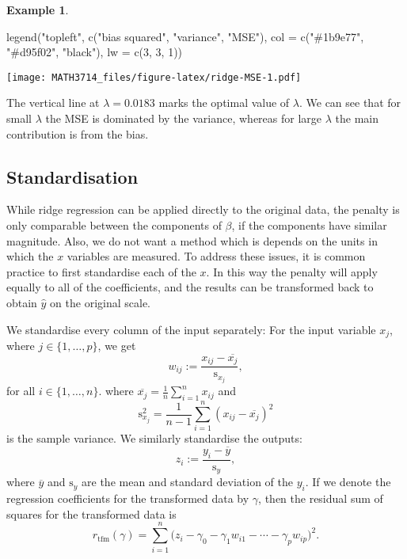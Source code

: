 \documentclass[
  a4paper,
]{article}
\newenvironment{Shaded}{\begin{snugshade}}{\end{snugshade}}
\newcommand{\AttributeTok}[1]{\textcolor[rgb]{0.77,0.63,0.00}{#1}}
\newcommand{\DecValTok}[1]{\textcolor[rgb]{0.00,0.00,0.81}{#1}}
\newcommand{\FunctionTok}[1]{\textcolor[rgb]{0.00,0.00,0.00}{#1}}
\newcommand{\NormalTok}[1]{#1}
\newcommand{\StringTok}[1]{\textcolor[rgb]{0.31,0.60,0.02}{#1}}
\theoremstyle{definition}
\theoremstyle{definition}
\newtheorem{example}{Example}[section]
\theoremstyle{definition}
\theoremstyle{definition}
\theoremstyle{remark}
\begin{document}
\begin{example}
\begin{Shaded}
\begin{Highlighting}[]
\FunctionTok{legend}\NormalTok{(}\StringTok{"topleft"}\NormalTok{,}
       \FunctionTok{c}\NormalTok{(}\StringTok{"bias squared"}\NormalTok{, }\StringTok{"variance"}\NormalTok{, }\StringTok{"MSE"}\NormalTok{),}
       \AttributeTok{col =} \FunctionTok{c}\NormalTok{(}\StringTok{"\#1b9e77"}\NormalTok{, }\StringTok{"\#d95f02"}\NormalTok{, }\StringTok{"black"}\NormalTok{),}
       \AttributeTok{lw =} \FunctionTok{c}\NormalTok{(}\DecValTok{3}\NormalTok{, }\DecValTok{3}\NormalTok{, }\DecValTok{1}\NormalTok{))}
\end{Highlighting}
\end{Shaded}

\texttt{[image: MATH3714\_files/figure-latex/ridge-MSE-1.pdf]}

The vertical line at \(\lambda = 0.0183\)
marks the optimal value of \(\lambda\). We can see that for small \(\lambda\) the
MSE is dominated by the variance, whereas for large \(\lambda\) the main
contribution is from the bias.
\end{example}

\hypertarget{standardisation}{%
\subsection{Standardisation}\label{standardisation}}

While ridge regression can be applied directly to the original data, the
penalty is only comparable between the components of \(\beta\), if the components
have similar magnitude. Also, we do not want a method which is depends on the
units in which the \(x\) variables are measured. To address these issues, it is
common practice to first standardise each of the \(x\). In this way the
penalty will apply equally to all of the coefficients, and the results can be
transformed back to obtain \(\hat{y}\) on the original scale.

We standardise every column of the input separately: For
the input variable \(x_j\), where \(j\in\{1, \ldots, p\}\), we get
\begin{equation*}
  w_{ij}
  := \frac{x_{ij} - \overline{x_j}}{\mathrm{s}_{x_j}},
\end{equation*}
for all \(i \in \{1, \ldots, n\}\).
where \(\overline{x_j} = \frac1n \sum_{i=1}^n x_{ij}\) and
\begin{equation*}
  \mathrm{s}_{x_j}^2
  = \frac{1}{n-1} \sum_{i=1}^n (x_{ij} - \overline{x_j})^2
\end{equation*}
is the sample variance. We similarly standardise the outputs:
\begin{equation*}
  z_i
  := \frac{y_i - \overline{y}}{\mathrm{s}_y},
\end{equation*}
where \(\overline{y}\) and \(\mathrm{s}_y\) are the mean and standard
deviation of the \(y_i\). If we denote the regression coefficients
for the transformed data by \(\gamma\), then the residual sum of
squares for the transformed data is
\begin{equation*}
  r_\mathrm{tfm}(\gamma)
  = \sum_{i=1}^n \bigl(z_i - \gamma_0 - \gamma_1 w_{i1} - \cdots - \gamma_p w_{ip} \bigr)^2.
\end{equation*}
\end{document}
